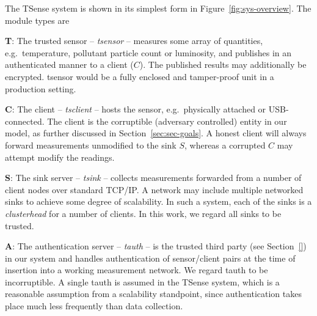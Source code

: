 The TSense system is shown in its simplest form in Figure~\ref{fig:sys-overview}. The module types are
%
\begin{description}

\item \textbf{T}: The trusted sensor -- \textit{tsensor} -- measures some array of quantities, e.g.\ temperature, pollutant particle count or luminosity, and publishes in an authenticated manner to a client ($C$). The published results may additionally be encrypted. tsensor would be a fully enclosed and tamper-proof unit in a production setting.

\item \textbf{C}: The client -- \textit{tsclient} -- hosts the sensor, e.g.\ physically attached or USB-connected. The client is the corruptible (adversary controlled) entity in our model, as further discussed in Section~\ref{sec:sec-goals}. A honest client will always forward measurements unmodified to the sink $S$, whereas a corrupted $C$ may attempt modify the readings.

\item \textbf{S}: The sink server -- \textit{tsink} -- collects measurements forwarded from a number of client nodes over standard TCP/IP. A network may include multiple networked sinks to achieve some degree of scalability. In such a system, each of the sinks is a \textit{clusterhead} for a number of clients. In this work, we regard all sinks to be trusted. %

\item \textbf{A}: The authentication server -- \textit{tauth} -- is the trusted third party (see Section~\ref{}) in our system and handles authentication of sensor/client pairs at the time of insertion into a working measurement network. 
We regard tauth to be incorruptible. A single tauth is assumed in the TSense system, which is a reasonable assumption from a scalability standpoint, since authentication takes place much less frequently than data collection.

\end{description}

